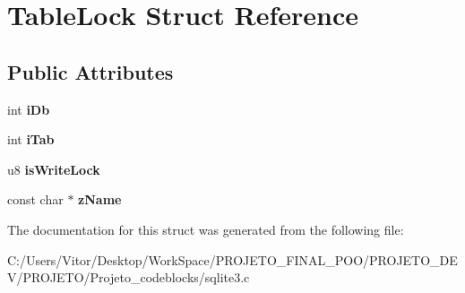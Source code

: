\hypertarget{struct_table_lock}{\section{Table\-Lock Struct Reference}
\label{struct_table_lock}
}
\subsection*{Public Attributes}
\begin{DoxyCompactItemize}
\item 
\hypertarget{struct_table_lock_ad5cc726ef29ffcca39ec0b72942513f6}{int {\bfseries i\-Db}}\label{struct_table_lock_ad5cc726ef29ffcca39ec0b72942513f6}

\item 
\hypertarget{struct_table_lock_ab25b5d9ba21ed96ed68ce8064ff84e24}{int {\bfseries i\-Tab}}\label{struct_table_lock_ab25b5d9ba21ed96ed68ce8064ff84e24}

\item 
\hypertarget{struct_table_lock_a171121af9886ee08044d4b82b991ceeb}{u8 {\bfseries is\-Write\-Lock}}\label{struct_table_lock_a171121af9886ee08044d4b82b991ceeb}

\item 
\hypertarget{struct_table_lock_ad1ce077fbd2600dd6d23ec08706dd227}{const char $\ast$ {\bfseries z\-Name}}\label{struct_table_lock_ad1ce077fbd2600dd6d23ec08706dd227}

\end{DoxyCompactItemize}


The documentation for this struct was generated from the following file\-:\begin{DoxyCompactItemize}
\item 
C\-:/\-Users/\-Vitor/\-Desktop/\-Work\-Space/\-P\-R\-O\-J\-E\-T\-O\-\_\-\-F\-I\-N\-A\-L\-\_\-\-P\-O\-O/\-P\-R\-O\-J\-E\-T\-O\-\_\-\-D\-E\-V/\-P\-R\-O\-J\-E\-T\-O/\-Projeto\-\_\-codeblocks/sqlite3.\-c\end{DoxyCompactItemize}
